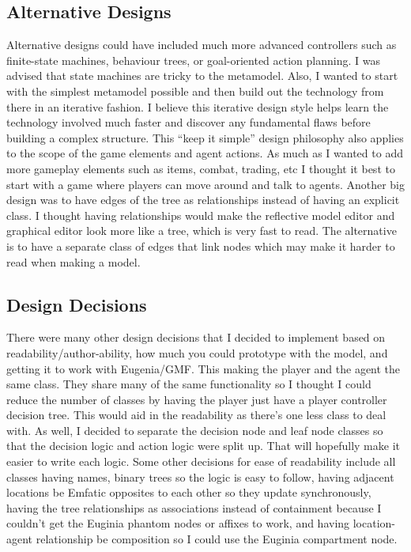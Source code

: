 \documentclass[letterpaper,12pt]{article}  %
\begin{document}
\subsection{Alternative Designs}
Alternative designs could have included much more advanced controllers such as finite-state machines, behaviour trees, or goal-oriented action planning. I was advised that state machines are tricky to the metamodel. Also, I wanted to start with the simplest metamodel possible and then build out the technology from there in an iterative fashion. I believe this iterative design style helps learn the technology involved much faster and discover any fundamental flaws before building a complex structure. This “keep it simple” design philosophy also applies to the scope of the game elements and agent actions. As much as I wanted to add more gameplay elements such as items, combat, trading, etc I thought it best to start with a game where players can move around and talk to agents. Another big design was to have edges of the tree as relationships instead of having an explicit class. I thought having relationships would make the reflective model editor and graphical editor look more like a tree, which is very fast to read. The alternative is to have a separate class of edges that link nodes which may make it harder to read when making a model.

\subsection{Design Decisions}
There were many other design decisions that I decided to implement based on readability/author-ability, how much you could prototype with the model, and getting it to work with Eugenia/GMF. This making the player and the agent the same class. They share many of the same functionality so I thought I could reduce the number of classes by having the player just have a player controller decision tree. This would aid in the readability as there’s one less class to deal with. As well, I decided to separate the decision node and leaf node classes so that the decision logic and action logic were split up. That will hopefully make it easier to write each logic. Some other decisions for ease of readability include all classes having names, binary trees so the logic is easy to follow, having adjacent locations be Emfatic opposites to each other so they update synchronously, having the tree relationships as associations instead of containment because I couldn’t get the Euginia phantom nodes or affixes to work, and having location-agent relationship be composition so I could use the Euginia compartment node.
\end{document}
